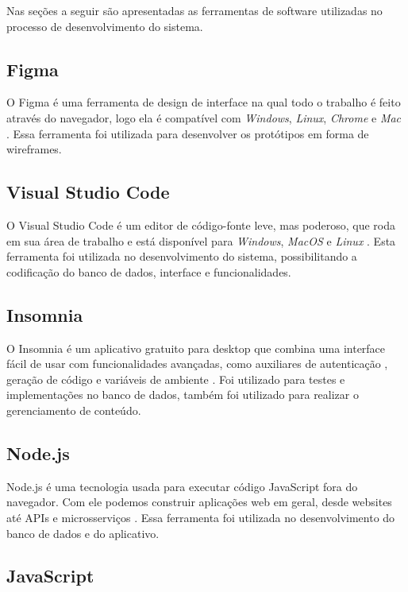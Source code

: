Nas seções a seguir são apresentadas as ferramentas de software utilizadas no processo de desenvolvimento do sistema.


\subsection{Figma}
\label{figma}

O Figma é uma ferramenta de design de interface na qual todo o trabalho é feito através do navegador, logo ela é compatível com \textit{Windows}, \textit{Linux}, \textit{Chrome} e \textit{Mac} \cite{siriusinterativa2019}. Essa ferramenta foi utilizada para desenvolver os protótipos em forma de wireframes.

\subsection{Visual Studio Code}
\label{visualStudioCode}

O Visual Studio Code é um editor de código-fonte leve, mas poderoso, que roda em sua área de trabalho e está disponível para \textit{Windows}, \textit{MacOS} e \textit{Linux} \cite{visualstudiocode2021}. Esta ferramenta foi utilizada no desenvolvimento do sistema, possibilitando a codificação do banco de dados, interface e funcionalidades.

\subsection{Insomnia}
\label{insomnia}

O Insomnia é um aplicativo gratuito para desktop que combina uma interface fácil de usar com funcionalidades avançadas, como auxiliares de autenticação , geração de código e variáveis de ambiente \cite{insomnia2021}. Foi utilizado para testes e implementações no banco de dados, também foi utilizado para realizar o gerenciamento de conteúdo.

\subsection{Node.js}
\label{nodejs}

Node.js é uma tecnologia usada para executar código JavaScript fora do navegador. Com ele podemos construir aplicações web em geral, desde websites até APIs e microsserviços \cite{devmedia}. Essa ferramenta foi utilizada no desenvolvimento do banco de dados e do aplicativo.

\subsection{JavaScript}
\label{javaScript}

